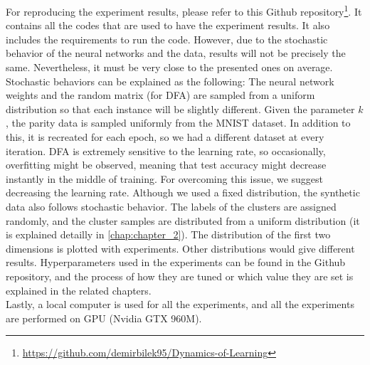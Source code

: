 \documentclass[a4paper, nobind]{templates/ociamthesis}
\newcommand*{\bibtitle}{References}
\begin{document}
For reproducing the experiment results, please refer to this Github repository\footnote{\url{https://github.com/demirbilek95/Dynamics-of-Learning}}. It contains all the codes that are used to have the experiment results. It also includes the requirements to run the code. However, due to the stochastic behavior of the neural networks and the data, results will not be precisely the same. Nevertheless, it must be very close to the presented ones on average. Stochastic behaviors can be explained as the following: The neural network weights and the random matrix (for DFA) are sampled from a uniform distribution so that each instance will be slightly different. Given the parameter \(k\), the parity data is sampled uniformly from the MNIST dataset. In addition to this, it is recreated for each epoch, so we had a different dataset at every iteration. DFA is extremely sensitive to the learning rate, so occasionally, overfitting might be observed, meaning that test accuracy might decrease instantly in the middle of training. For overcoming this issue, we suggest decreasing the learning rate. Although we used a fixed distribution, the synthetic data also follows stochastic behavior. The labels of the clusters are assigned randomly, and the cluster samples are distributed from a uniform distribution (it is explained detailly in \ref{chap:chapter_2}). The distribution of the first two dimensions is plotted with experiments. Other distributions would give different results. Hyperparameters used in the experiments can be found in the Github repository, and the process of how they are tuned or which value they are set is explained in the related chapters.\\
Lastly, a local computer is used for all the experiments, and all the experiments are performed on GPU (Nvidia GTX 960M).


\setlength{\baselineskip}{0pt} %

{\renewcommand*\MakeUppercase[1]{#1}%
\printbibliography[heading=bibintoc,title={\bibtitle}]}
\end{document}
